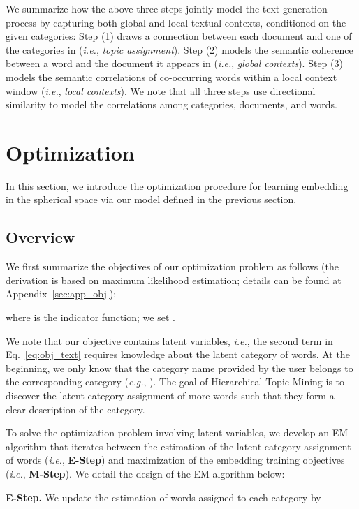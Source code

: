 \documentclass[sigconf]{acmart}
\newcommand{\ie}{\emph{i.e.}}
\newcommand{\eg}{\emph{e.g.}}
\theoremstyle{definition}
\begin{document}
We summarize how the above three steps jointly model the text generation process by capturing both global and local textual contexts, conditioned on the given categories: Step (1) draws a connection between each document and one of the categories in  (\ie, \emph{topic assignment}). Step (2) models the semantic coherence between a word and the document it appears in (\ie, \emph{global contexts}). Step (3) models the semantic correlations of co-occurring words within a local context window (\ie, \emph{local contexts}). 
We note that all three steps use directional similarity to model the correlations among categories, documents, and words. 

 


\section{Optimization}
\label{sec:opt}

In this section, we introduce the optimization procedure for learning embedding in the spherical space via our model defined in the previous section.
\subsection{Overview}
We first summarize the objectives of our optimization problem as follows (the derivation is based on maximum likelihood estimation; details can be found at Appendix~\ref{sec:app_obj}):





where  is the indicator function; we set .

We note that our objective contains latent variables, \ie, the second term in Eq.~\eqref{eq:obj_text} requires knowledge about the latent category of words. At the beginning, we only know that the category name provided by the user belongs to the corresponding category (\eg, ). The goal of Hierarchical Topic Mining is to discover the latent category assignment of more words such that they form a clear description of the category.

To solve the optimization problem involving latent variables, we develop an EM algorithm that iterates between the estimation of the latent category assignment of words (\ie, \textbf{E-Step}) and maximization of the embedding training objectives (\ie, \textbf{M-Step}). We detail the design of the EM algorithm below:

\noindent
\textbf{E-Step.}
We update the estimation of words assigned to each category by
\end{document}
